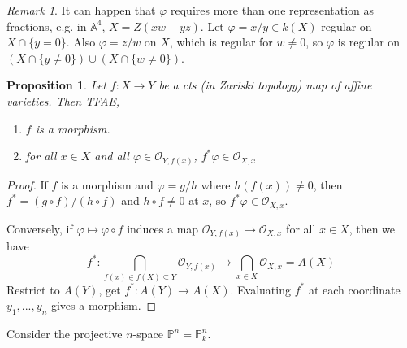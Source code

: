 \documentclass{article}
\theoremstyle{definition}
\theoremstyle{remark}
\newtheorem{rem}{Remark}
\theoremstyle{plain}
\newtheorem{prop}[defn]{Proposition}
\newcommand{\PP}{\mathbb{P}}
\newcommand{\bA}{\mathbb{A}}
\begin{document}
\begin{rem}
    It can happen that $\varphi$ requires more than one representation as fractions, e.g. in $\bA^4$, $X=Z(xw-yz)$. Let $\varphi=x/y\in k(X)$ regular on $X\cap \{y=0\}$. Also $\varphi=z/w$ on $X$, which is regular for $w\neq 0$, so $\varphi$ is regular on $(X\cap\{y\neq 0\})\cup (X\cap \{w\neq 0\})$.
\end{rem}

\begin{prop}
    Let $f:X\to Y$ be a cts (in Zariski topology) map of affine varieties. Then TFAE,
    \begin{enumerate}[1)]
        \item $f$ is a morphism.
        \item for all $x\in X$ and all $\varphi\in\mathcal O_{Y,f(x)}$, $f^\ast\varphi\in\mathcal O_{X,x}$
    \end{enumerate}
\end{prop}
\begin{proof}
    If $f$ is a morphism and $\varphi=g/h$ where $h(f(x))\neq 0$, then $f^\ast=(g\circ f)/(h\circ f)$ and $h\circ f\neq 0$ at $x$, so $f^\ast\varphi\in\mathcal O_{X,x}$. 

    Conversely, if $\varphi\mapsto\varphi\circ f$ induces a map $\mathcal O_{Y,f(x)}\to \mathcal O_{X,x}$ for all $x\in X$, then we have
    \[f^\ast:\bigcap_{f(x)\in f(X)\subseteq Y}\mathcal O_{Y,f(x)}\to\bigcap_{x\in X}\mathcal O_{X,x}=A(X)\]
    Restrict to $A(Y)$, get $f^\ast:A(Y)\to A(X)$. Evaluating $f^\ast$ at each coordinate $y_1,...,y_n$ gives a morphism.
\end{proof}

Consider the projective $n$-space $\PP^n=\PP^n_k$.
\end{document}
